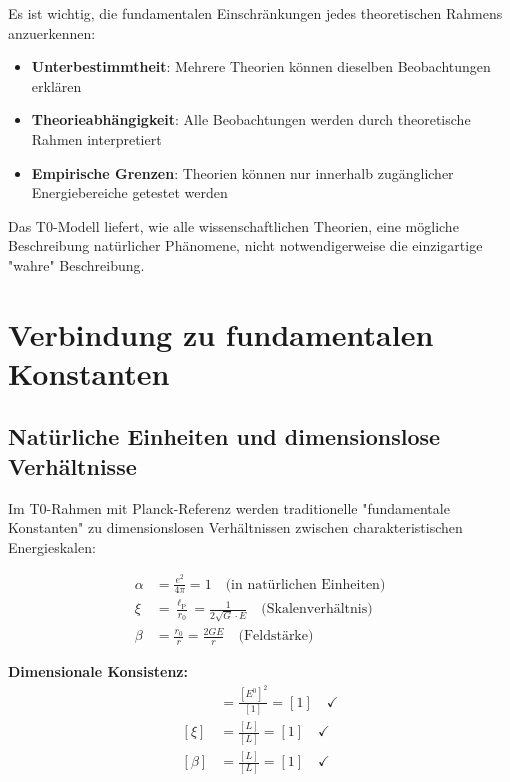 \documentclass[12pt,a4paper]{report}
\newcommand{\lP}{\ell_{\text{P}}}         %
\newcommand{\rzero}{r_0}                  %
\newcommand{\alphafine}{\alpha}           %
\begin{document}
	Es ist wichtig, die fundamentalen Einschränkungen jedes theoretischen Rahmens anzuerkennen:
	
	\begin{itemize}
		\item \textbf{Unterbestimmtheit}: Mehrere Theorien können dieselben Beobachtungen erklären
		\item \textbf{Theorieabhängigkeit}: Alle Beobachtungen werden durch theoretische Rahmen interpretiert
		\item \textbf{Empirische Grenzen}: Theorien können nur innerhalb zugänglicher Energiebereiche getestet werden
	\end{itemize}
	
	Das T0-Modell liefert, wie alle wissenschaftlichen Theorien, eine mögliche Beschreibung natürlicher Phänomene, nicht notwendigerweise die einzigartige "wahre" Beschreibung.
	
	\section{Verbindung zu fundamentalen Konstanten}\label{sec:fundamental_constants}
	
	\subsection{Natürliche Einheiten und dimensionslose Verhältnisse}\label{subsec:natural_units_ratios}
	
	Im T0-Rahmen mit Planck-Referenz werden traditionelle "fundamentale Konstanten" zu dimensionslosen Verhältnissen zwischen charakteristischen Energieskalen:
	
	\begin{align}
		\alphafine &= \frac{e^2}{4\pi} = 1 \quad \text{(in natürlichen Einheiten)} \\
		\xi &= \frac{\lP}{\rzero} = \frac{1}{2\sqrt{G} \cdot E} \quad \text{(Skalenverhältnis)} \\
		\beta &= \frac{\rzero}{r} = \frac{2GE}{r} \quad \text{(Feldstärke)}
	\end{align}
	
	\textbf{Dimensionale Konsistenz:}
	\begin{align}
		[\alphafine] &= \frac{[E^0]^2}{[1]} = [1] \quad \checkmark \\
		[\xi] &= \frac{[L]}{[L]} = [1] \quad \checkmark \\
		[\beta] &= \frac{[L]}{[L]} = [1] \quad \checkmark
	\end{align}
	
\end{document}
